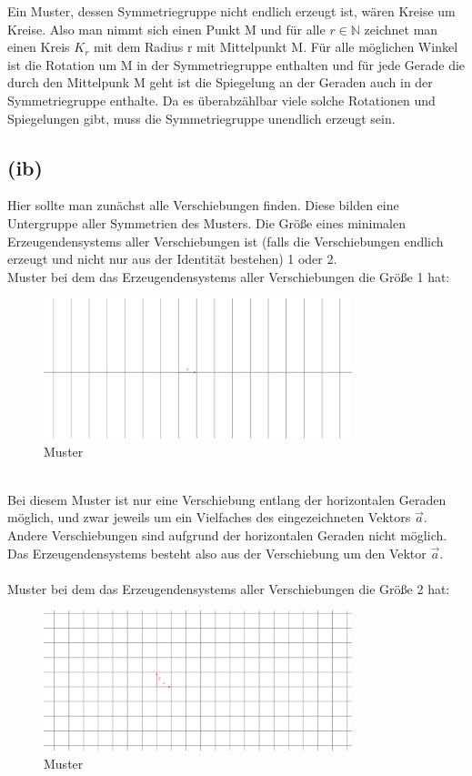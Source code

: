 \documentclass[12pt,a4paper]{article}
\begin{document}
\noindent Ein Muster, dessen Symmetriegruppe nicht endlich erzeugt ist, wären Kreise um Kreise. Also man nimmt sich einen Punkt M und für alle $r \in \mathbb{N}$ zeichnet man einen Kreis $K_r$ mit dem Radius r mit Mittelpunkt M. Für alle möglichen Winkel ist die Rotation um M in der Symmetriegruppe enthalten und für jede Gerade die durch den Mittelpunk M geht ist die Spiegelung an der Geraden auch in der Symmetriegruppe enthalte. Da es überabzählbar viele solche Rotationen und Spiegelungen gibt, muss die Symmetriegruppe unendlich erzeugt sein.\\

\newpage
\subsection*{(ib)}
\noindent Hier sollte man zunächst alle Verschiebungen finden. Diese bilden eine Untergruppe aller Symmetrien des Musters. Die Größe eines minimalen Erzeugendensystems aller Verschiebungen ist (falls die
Verschiebungen endlich erzeugt und nicht nur aus der Identität bestehen) 1 oder 2.\\
Muster bei dem das Erzeugendensystems aller Verschiebungen die Größe 1 hat:
\begin{figure}[htbp]
    \centering
    \includegraphics[width=0.8\textwidth]{Blatt07_Aufgabe_19_ib_1.png}
    \caption{Muster}
    \label{fig:Aufgabe_19}
\end{figure}
\\
Bei diesem Muster ist nur eine Verschiebung entlang der horizontalen Geraden möglich, und zwar jeweils um ein Vielfaches des eingezeichneten Vektors $\vec{a}$. Andere Verschiebungen sind aufgrund der horizontalen Geraden nicht möglich. Das Erzeugendensystems besteht also aus der Verschiebung um den Vektor $\vec{a}$.\\
\\
Muster bei dem das Erzeugendensystems aller Verschiebungen die Größe 2 hat:
\begin{figure}[htbp]
    \centering
    \includegraphics[width=0.8\textwidth]{Blatt07_Aufgabe_19_ib_2.png}
    \caption{Muster}
    \label{fig:Aufgabe_19}
\end{figure}
\end{document}

